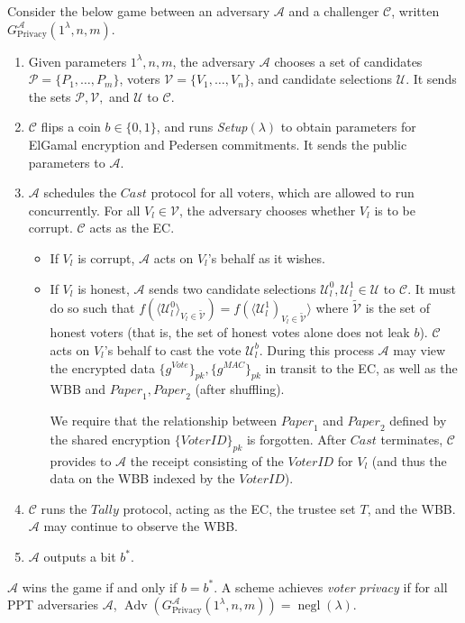 \documentclass[12pt,a4paper]{article}
\DeclareMathOperator{\negl}{\text{negl}}
\DeclareMathOperator{\Adv}{\text{Adv}}
\theoremstyle{definition}
\newcommand{\Vote}{\mathit{Vote}}
\newcommand{\VoterID}{\mathit{VoterID}}
\newcommand{\Paper}{\mathit{Paper}}
\newcommand{\Mac}{\mathit{MAC}}
\begin{document}
\begin{definition}
    Consider the below game between an adversary $\mathcal{A}$ and a challenger $\mathcal{C}$, written $G^\mathcal{A}_{\text{Privacy}}(1^\lambda, n, m)$.
    \begin{enumerate}
        \item Given parameters $1^\lambda, n, m$, the adversary $\mathcal{A}$ chooses a set of candidates $\mathcal{P}=\{P_1,\ldots,P_m\}$, voters $\mathcal{V}=\{V_1,\ldots,V_n\}$, and candidate selections $\mathcal{U}$. It sends the sets $\mathcal{P}, \mathcal{V},$ and $\mathcal{U}$ to $\mathcal{C}$.
        \item $\mathcal{C}$ flips a coin $b\in\{0, 1\}$, and runs \textit{Setup}$(\lambda)$ to obtain parameters for ElGamal encryption and Pedersen commitments. It sends the public parameters to $\mathcal{A}$.
        \item $\mathcal{A}$ schedules the $\mathit{Cast}$ protocol for all voters, which are allowed to run concurrently. For all $V_l\in\mathcal{V}$, the adversary chooses whether $V_l$ is to be corrupt. $\mathcal{C}$ acts as the EC.
        \begin{itemize}
            \item If $V_l$ is corrupt, $\mathcal{A}$ acts on $V_l$'s behalf as it wishes.
            \item If $V_l$ is honest, $\mathcal{A}$ sends two candidate selections $\mathcal{U}_l^0, \mathcal{U}_l^1 \in \mathcal{U}$ to $\mathcal{C}$. It must do so such that $f(\langle\mathcal{U}_l^0\rangle_{V_l\in \tilde{\mathcal{V}}})=f(\langle\mathcal{U}^1_l)_{V_l\in \tilde{\mathcal{V}}}\rangle$ where $\tilde{\mathcal{V}}$ is the set of honest voters (that is, the set of honest votes alone does not leak $b$). $\mathcal{C}$ acts on $V_l$'s behalf to cast the vote $\mathcal{U}_l^b$. During this process $\mathcal{A}$ may view the encrypted data $\{g^{\Vote}\}_{\mathit{pk}}, \{g^{\Mac}\}_{\mathit{pk}}$ in transit to the EC, as well as the WBB and $\Paper_1, \Paper_2$ (after shuffling).
            
            We require that the relationship between $\Paper_1$ and $\Paper_2$ defined by the shared encryption $\{\VoterID\}_{pk}$ is forgotten. After $\textit{Cast}$ terminates, $\mathcal{C}$ provides to $\mathcal{A}$ the receipt consisting of the $\VoterID$ for $V_l$ (and thus the data on the WBB indexed by the $\VoterID$).
        \end{itemize}
        \item $\mathcal{C}$ runs the $\mathit{Tally}$ protocol, acting as the EC, the trustee set $T$, and the WBB. $\mathcal{A}$ may continue to observe the WBB.
        \item $\mathcal{A}$ outputs a bit $b^*$.
    \end{enumerate}
    $\mathcal{A}$ wins the game if and only if $b=b^*$. A scheme achieves \textit{voter privacy} if for all PPT adversaries $\mathcal{A}$, $\Adv\left(G^\mathcal{A}_{\text{Privacy}}(1^\lambda, n, m)\right)=\negl(\lambda)$.
\end{definition}
\end{document}
